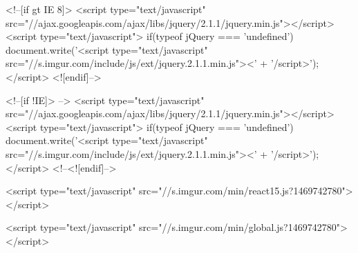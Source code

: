 <!--[if gt IE 8]>
<script type="text/javascript" src="//ajax.googleapis.com/ajax/libs/jquery/2.1.1/jquery.min.js"></script>
<script type="text/javascript">
if(typeof jQuery === 'undefined') {
    document.write('<script type="text/javascript" src="//s.imgur.com/include/js/ext/jquery.2.1.1.min.js"><' + '/script>');
}
</script>
<![endif]-->

<!--[if !IE]> -->
<script type="text/javascript" src="//ajax.googleapis.com/ajax/libs/jquery/2.1.1/jquery.min.js"></script>
<script type="text/javascript">
if(typeof jQuery === 'undefined') {
    document.write('<script type="text/javascript" src="//s.imgur.com/include/js/ext/jquery.2.1.1.min.js"><' + '/script>');
}
</script>
<!--<![endif]-->



                    <script type="text/javascript" src="//s.imgur.com/min/react15.js?1469742780"></script>

        
        <script type="text/javascript" src="//s.imgur.com/min/global.js?1469742780"></script>

